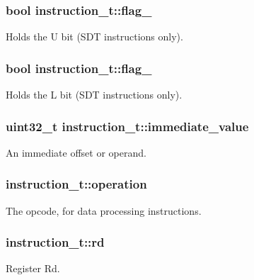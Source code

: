 \subsubsection[{\texorpdfstring{flag\+\_\+2}{flag_2}}]{\setlength{\rightskip}{0pt plus 5cm}bool instruction\+\_\+t\+::flag\+\_}\hypertarget{structinstruction__t_a185bd7654f18f654b666ccfe1d857659}{}\label{structinstruction__t_a185bd7654f18f654b666ccfe1d857659}
Holds the U bit (S\+DT instructions only). 
\subsubsection[{\texorpdfstring{flag\+\_\+3}{flag_3}}]{\setlength{\rightskip}{0pt plus 5cm}bool instruction\+\_\+t\+::flag\+\_}\hypertarget{structinstruction__t_a004b3ac9779d188ae99bc0c7180dab8d}{}\label{structinstruction__t_a004b3ac9779d188ae99bc0c7180dab8d}
Holds the L bit (S\+DT instructions only). 
\subsubsection[{\texorpdfstring{immediate\+\_\+value}{immediate_value}}]{\setlength{\rightskip}{0pt plus 5cm}uint32\+\_\+t instruction\+\_\+t\+::immediate\+\_\+value}\hypertarget{structinstruction__t_a6137fca8ba59012415bd91175ecbc0c2}{}\label{structinstruction__t_a6137fca8ba59012415bd91175ecbc0c2}
An immediate offset or operand. 
\subsubsection[{\texorpdfstring{operation}{operation}}]{ instruction\+\_\+t\+::operation}\hypertarget{structinstruction__t_ae29eba9c0dfbec4abcd24cf4a927d2b7}{}\label{structinstruction__t_ae29eba9c0dfbec4abcd24cf4a927d2b7}
The opcode, for data processing instructions. 
\subsubsection[{\texorpdfstring{rd}{rd}}]{ instruction\+\_\+t\+::rd}\hypertarget{structinstruction__t_a8ab8a544fae4f96f3ebf0b8b36ac3e1d}{}\label{structinstruction__t_a8ab8a544fae4f96f3ebf0b8b36ac3e1d}
Register Rd. 
